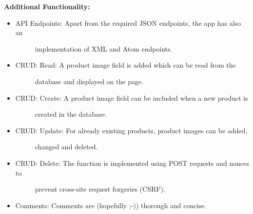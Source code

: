 \documentclass[letterpaper,10pt,english]{sphinxmanual}
\begin{document}
\textbf{Additional Functionality:}
\begin{itemize}
\item {} \begin{description}
\item[{API Endpoints: Apart from the required JSON endpoints, the app has also an}] \leavevmode
implementation of XML and Atom endpoints.

\end{description}

\item {} \begin{description}
\item[{CRUD: Read:    A product image field is added which can be read from the}] \leavevmode
database and displayed on the page.

\end{description}

\item {} \begin{description}
\item[{CRUD: Create:  A product image field can be included when a new product is}] \leavevmode
created in the database.

\end{description}

\item {} \begin{description}
\item[{CRUD: Update:  For already existing products, product images can be added,}] \leavevmode
changed and deleted.

\end{description}

\item {} \begin{description}
\item[{CRUD: Delete:  The function is implemented using POST requests and nonces to}] \leavevmode
prevent cross-site request forgeries (CSRF).

\end{description}

\item {} 
Comments:      Comments are (hopefully ;-)) thorough and concise.

\end{itemize}
\end{document}
